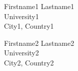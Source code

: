 \begin{minipage}[t]{.3\textwidth}
\end{minipage}
\begin{minipage}[t]{.3\textwidth}
\end{minipage}

\vspace{1mm}

\begin{minipage}[t]{.3\textwidth}
    Firstname1 Lastname1\\[.1cm]
    University1\\
    City1, Country1
\end{minipage}
\begin{minipage}[t]{.3\textwidth}
    Firstname2 Lastname2\\[.1cm]
    University2 \\
    City2, Country2
\end{minipage}

\newpage
